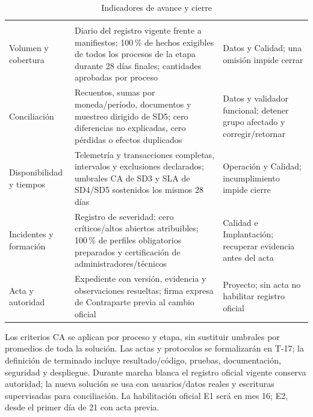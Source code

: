 \begin{longtable}{L{35mm}L{69mm}L{45mm}}
\caption{Indicadores de avance y cierre}\label{tab:t18-indicadores}\\\hline
  &  & \\\hline\endfirsthead
\hline {} &  & \\\hline\endhead
Volumen y cobertura & Diario del registro vigente frente a manifiestos; 100\,\% de hechos exigibles de todos los procesos de la etapa durante 28 días finales; cantidades aprobadas por proceso & Datos y Calidad; una omisión impide cerrar\\\hline
Conciliación & Recuentos, sumas por moneda/período, documentos y muestreo dirigido de SD5; cero diferencias no explicadas, cero pérdidas o efectos duplicados & Datos y validador funcional; detener grupo afectado y corregir/retornar\\\hline
Disponibilidad y tiempos & Telemetría y transacciones completas, intervalos y exclusiones declarados; umbrales CA de SD3 y SLA de SD4/SD5 sostenidos los mismos 28 días & Operación y Calidad; incumplimiento impide cierre\\\hline
Incidentes y formación & Registro de severidad; cero críticos/altos abiertos atribuibles; 100\,\% de perfiles obligatorios preparados y certificación de administradores/técnicos & Calidad e Implantación; recuperar evidencia antes del acta\\\hline
Acta y autoridad & Expediente con versión, evidencia y observaciones resueltas; firma expresa de Contraparte previa al cambio oficial & Proyecto; sin acta no habilitar registro oficial\\\hline
\end{longtable}
\fi

Los criterios CA se aplican por proceso y etapa, sin sustituir umbrales por promedios de toda la solución. Las actas y protocolos se formalizarán en T-17; la definición de terminado incluye resultado/código, pruebas, documentación, seguridad y despliegue. Durante marcha blanca el registro oficial vigente conserva autoridad; la nueva solución se usa con usuarios/datos reales y escrituras supervisadas para conciliación. La habilitación oficial E1 será en mes 16; E2, desde el primer día de 21 con acta previa.~\parencite[arts.~17--18; pp.~12--13]{bases-admin}~\parencite[RT-20.04/07/08; p.~35]{bases-transversales}
